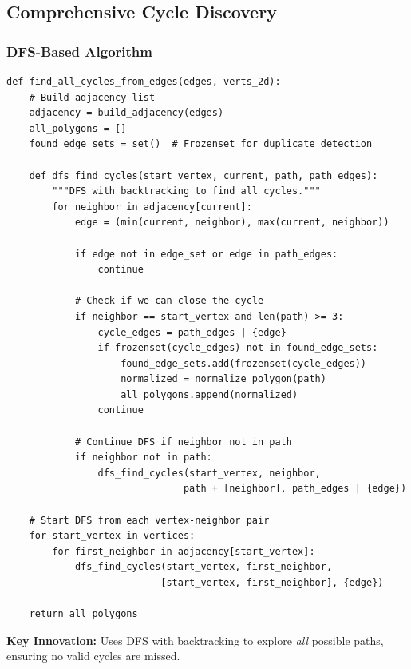 \documentclass[11pt]{article}
\begin{document}
\subsection{Comprehensive Cycle Discovery}

\subsubsection{DFS-Based Algorithm}

\begin{lstlisting}[caption={Find all cycles using depth-first search with backtracking},label={lst:cyclediscovery}]
def find_all_cycles_from_edges(edges, verts_2d):
    # Build adjacency list
    adjacency = build_adjacency(edges)
    all_polygons = []
    found_edge_sets = set()  # Frozenset for duplicate detection
    
    def dfs_find_cycles(start_vertex, current, path, path_edges):
        """DFS with backtracking to find all cycles."""
        for neighbor in adjacency[current]:
            edge = (min(current, neighbor), max(current, neighbor))
            
            if edge not in edge_set or edge in path_edges:
                continue
            
            # Check if we can close the cycle
            if neighbor == start_vertex and len(path) >= 3:
                cycle_edges = path_edges | {edge}
                if frozenset(cycle_edges) not in found_edge_sets:
                    found_edge_sets.add(frozenset(cycle_edges))
                    normalized = normalize_polygon(path)
                    all_polygons.append(normalized)
                continue
            
            # Continue DFS if neighbor not in path
            if neighbor not in path:
                dfs_find_cycles(start_vertex, neighbor,
                               path + [neighbor], path_edges | {edge})
    
    # Start DFS from each vertex-neighbor pair
    for start_vertex in vertices:
        for first_neighbor in adjacency[start_vertex]:
            dfs_find_cycles(start_vertex, first_neighbor,
                           [start_vertex, first_neighbor], {edge})
    
    return all_polygons
\end{lstlisting}

\textbf{Key Innovation:} Uses DFS with backtracking to explore \textit{all} possible paths, ensuring no valid cycles are missed.
\end{document}
